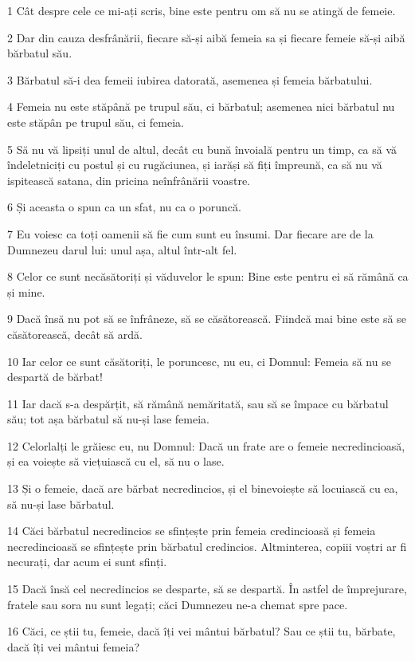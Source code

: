\par 1 Cât despre cele ce mi-ați scris, bine este pentru om să nu se atingă de femeie.
\par 2 Dar din cauza desfrânării, fiecare să-și aibă femeia sa și fiecare femeie să-și aibă bărbatul său.
\par 3 Bărbatul să-i dea femeii iubirea datorată, asemenea și femeia bărbatului.
\par 4 Femeia nu este stăpână pe trupul său, ci bărbatul; asemenea nici bărbatul nu este stăpân pe trupul său, ci femeia.
\par 5 Să nu vă lipsiți unul de altul, decât cu bună învoială pentru un timp, ca să vă îndeletniciți cu postul și cu rugăciunea, și iarăși să fiți împreună, ca să nu vă ispitească satana, din pricina neînfrânării voastre.
\par 6 Și aceasta o spun ca un sfat, nu ca o poruncă.
\par 7 Eu voiesc ca toți oamenii să fie cum sunt eu însumi. Dar fiecare are de la Dumnezeu darul lui: unul așa, altul într-alt fel.
\par 8 Celor ce sunt necăsătoriți și văduvelor le spun: Bine este pentru ei să rămână ca și mine.
\par 9 Dacă însă nu pot să se înfrâneze, să se căsătorească. Fiindcă mai bine este să se căsătorească, decât să ardă.
\par 10 Iar celor ce sunt căsătoriți, le poruncesc, nu eu, ci Domnul: Femeia să nu se despartă de bărbat!
\par 11 Iar dacă s-a despărțit, să rămână nemăritată, sau să se împace cu bărbatul său; tot așa bărbatul să nu-și lase femeia.
\par 12 Celorlalți le grăiesc eu, nu Domnul: Dacă un frate are o femeie necredincioasă, și ea voiește să viețuiască cu el, să nu o lase.
\par 13 Și o femeie, dacă are bărbat necredincios, și el binevoiește să locuiască cu ea, să nu-și lase bărbatul.
\par 14 Căci bărbatul necredincios se sfințește prin femeia credincioasă și femeia necredincioasă se sfințește prin bărbatul credincios. Altminterea, copiii voștri ar fi necurați, dar acum ei sunt sfinți.
\par 15 Dacă însă cel necredincios se desparte, să se despartă. În astfel de împrejurare, fratele sau sora nu sunt legați; căci Dumnezeu ne-a chemat spre pace.
\par 16 Căci, ce știi tu, femeie, dacă îți vei mântui bărbatul? Sau ce știi tu, bărbate, dacă îți vei mântui femeia?
